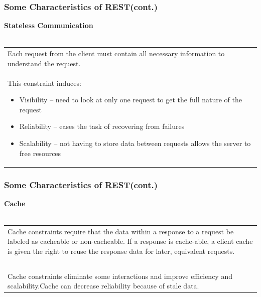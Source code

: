 \documentclass{beamer}
\begin{document}

\begin{frame}
\frametitle{Some Characteristics of REST(cont.)}
\textbf{Stateless Communication}
\\~\\
\begin{tabular}{@{\hspace{3ex}}p{30em}}
Each request from the client must contain all necessary information to understand the request.
\\
This constraint induces:
\begin{itemize}
\item Visibility – need to look at only one request to get the full nature of the request
\item Reliability – eases the task of recovering from failures
\item Scalability – not having to store data between requests allows the server to free resources


\end{itemize}
\end{tabular}

\end{frame}


\begin{frame}
\frametitle{Some Characteristics of REST(cont.)}
\textbf{Cache}
\\~\\
\begin{tabular}{@{\hspace{3ex}}p{28em}}
Cache constraints require that the data within a response to a request be labeled as cacheable or non-cacheable. If a response is cache-able, a client cache is given the right to reuse the response data for later, equivalent requests.
\\~\\
Cache constraints eliminate some interactions and improve efficiency and scalability.Cache can decrease reliability because of stale data.

\end{tabular}
\end{frame}


\end{document}
